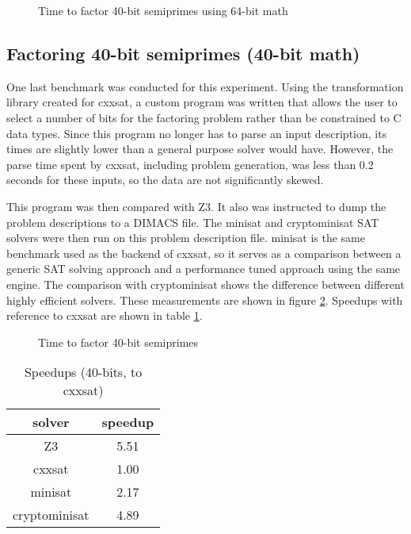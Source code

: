 \documentclass{sig-alternate}
\begin{document}
\begin{figure}
    
    \caption{Time to factor 40-bit semiprimes using 64-bit math}
    \label{fig:bit20}
\end{figure}

\subsection{Factoring 40-bit semiprimes (40-bit math)}

One last benchmark was conducted for this experiment.  Using the transformation
library created for cxxsat, a custom program was written that allows the user
to select a number of bits for the factoring problem rather than be constrained
to C data types.  Since this program no longer has to parse an input description,
its times are slightly lower than a general purpose solver would have.  However,
the parse time spent by cxxsat, including problem generation, was less than 0.2
seconds for these inputs, so the data are not significantly skewed.

This program was then compared with Z3.  It also was instructed to dump the
problem descriptions to a DIMACS file.  The minisat and cryptominisat SAT solvers
were then run on this problem description file.  minisat is the same benchmark
used as the backend of cxxsat, so it serves as a comparison between a generic
SAT solving approach and a performance tuned approach using the same engine.
The comparison with cryptominisat shows the difference between different
highly efficient solvers.  These measurements are shown in figure
\ref{fig:solver_comparison}.  Speedups with reference to cxxsat are shown in
table \ref{tab:solver_comparison}.

\begin{figure}
    
    \caption{Time to factor 40-bit semiprimes}
    \label{fig:solver_comparison}
\end{figure}

\begin{table}
    \caption{Speedups (40-bits, to cxxsat)}
    \label{tab:solver_comparison}
    \begin{center}
        \smallskip
        \begin{tabular}[]{c | c}
            solver        & speedup \\
            \hline
            Z3            & 5.51 \\
            cxxsat        & 1.00 \\
            minisat       & 2.17 \\
            cryptominisat & 4.89

        \end{tabular}
    \end{center}
\end{table}
\end{document}
